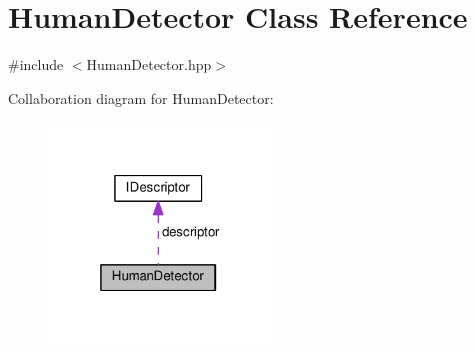 \hypertarget{classHumanDetector}{}\section{Human\+Detector Class Reference}
\label{classHumanDetector}


{\ttfamily \#include $<$Human\+Detector.\+hpp$>$}



Collaboration diagram for Human\+Detector\+:
\nopagebreak
\begin{figure}[H]
\begin{center}
\leavevmode
\includegraphics[width=169pt]{classHumanDetector__coll__graph}
\end{center}
\end{figure}
